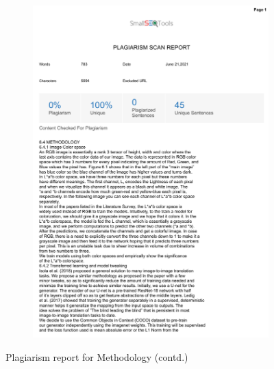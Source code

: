 \documentclass[oneside,a4paper,12pt]{report}
\begin{document}
\begin{appendices}
\begin{figure}
\begin{subfigure}[H]{\textwidth}
    	\includegraphics[scale=0.7, page=2]{plagiarism/methodology.pdf}
    \end{subfigure}
    \caption{Plagiarism report for Methodology (contd.)}
    \label{PlagiarismMethodology_1}
\end{figure}


\end{appendices}
\end{document}
